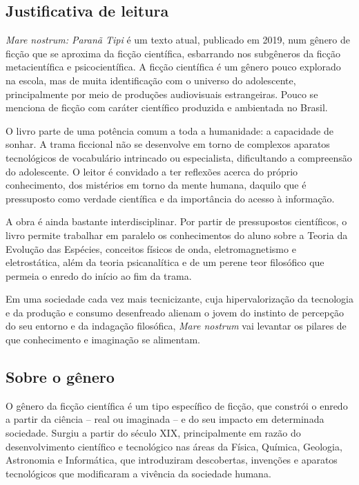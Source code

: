 \documentclass[12pt]{extarticle}
\begin{document}
\subsection{Justificativa de leitura}
\textit{Mare nostrum: Paranã Tipi} é um texto atual, publicado em 2019, num
gênero de ficção que se aproxima da ficção científica, esbarrando nos
subgêneros da ficção metacientífica e psicocientífica. A ficção científica é um
gênero pouco explorado na escola, mas de muita identificação com o universo do
adolescente, principalmente por meio de produções audiovisuais estrangeiras.
Pouco se menciona de ficção com caráter científico produzida e ambientada no
Brasil.

O livro parte de uma potência comum a toda a humanidade: a capacidade de
sonhar. A trama ficcional não se desenvolve em torno de complexos aparatos
tecnológicos de vocabulário intrincado ou especialista, dificultando a
compreensão do adolescente. O leitor é convidado a ter reflexões acerca do próprio
conhecimento, dos mistérios em torno da mente humana, daquilo que é pressuposto
como verdade científica e da importância do acesso à informação.

A obra é ainda bastante interdisciplinar. Por partir de pressupostos
científicos, o livro permite trabalhar em paralelo os conhecimentos do aluno
sobre a Teoria da Evolução das Espécies, conceitos físicos de onda, eletromagnetismo 
e eletrostática, além da teoria psicanalítica e de um perene teor
filosófico que permeia o enredo do início ao fim da trama.

Em uma sociedade cada vez mais tecnicizante, cuja hipervalorização da
tecnologia e da produção e consumo desenfreado alienam o jovem do instinto de
percepção do seu entorno e da indagação filosófica, 
\emph{Mare nostrum} vai levantar os pilares de que conhecimento e imaginação se alimentam.

\subsection{Sobre o gênero}
O gênero da ficção científica é um tipo específico de ficção, que constrói o
enredo a partir da ciência – real ou imaginada – e do seu impacto em
determinada sociedade. Surgiu a partir do século {XIX}, principalmente em razão
do desenvolvimento científico e tecnológico nas áreas da Física, Química,
Geologia, Astronomia e Informática, que introduziram descobertas, invenções e
aparatos tecnológicos que modificaram a vivência da sociedade humana.
\end{document}
